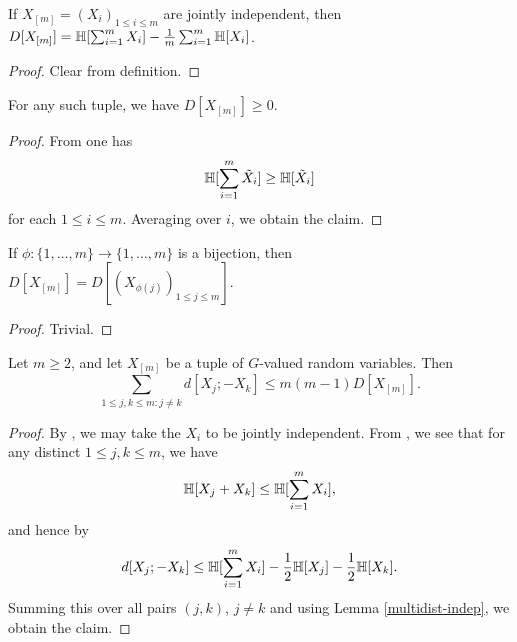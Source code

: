 \begin{lemma}\label{multidist-indep}\leanok  If $X_{[m]} = (X_i)_{1 \leq i \leq m}$ are jointly independent, then $D[X_{[m]}] = \mathbb{H}[\sum_{i=1}^m X_i] - \frac{1}{m} \sum_{i=1}^m \mathbb{H}[X_i]$.
\end{lemma}

\begin{proof}\leanok  Clear from definition.
\end{proof}

\begin{lemma}[Nonnegativity]\label{multidist-nonneg}\leanok  For any such tuple, we have $D[X_{[m]}] \geq 0$.
\end{lemma}

\begin{proof}\leanok  From  one has
$$ \mathbb{H}[\sum_{i =1}^m \tilde X_i] \geq \mathbb{H}[\tilde X_i]$$
for each $1 \leq i \leq m$.  Averaging over $i$, we obtain the claim.
\end{proof}

\begin{lemma}[Relabeling]\label{multidist-perm}\leanok If $\phi: \{1,\dots,m\} \to \{1,\dots,m\}$ is a bijection, then $D[X_{[m]}] = D[(X_{\phi(j)})_{1 \leq j \leq m}]$.
\end{lemma}

\begin{proof}\leanok Trivial.
\end{proof}

\begin{lemma}\label{multidist-ruzsa-I}\leanok
  Let $m \ge 2$, and let $X_{[m]}$ be a tuple of $G$-valued random variables. Then
  $$\sum_{1 \leq j,k \leq m: j \neq k} d[X_j; -X_k] \leq m(m-1) D[X_{[m]}].$$
\end{lemma}

\begin{proof}\leanok
By ,  we may take the $X_i$ to be jointly independent.  From , we see that for any distinct $1 \leq j,k \leq m$, we have
  \[
    \mathbb{H}[X_j+X_k] \leq \mathbb{H}[\sum_{i=1}^m X_i],
  \]
  and hence by 
  \[
    d[X_j;-X_k] \leq \mathbb{H}[\sum_{i=1}^m X_i] - \frac{1}{2} \mathbb{H}[X_j] - \frac{1}{2} \mathbb{H}[X_k].
  \]
  Summing this over all pairs $(j,k)$, $j \neq k$ and using Lemma \ref{multidist-indep}, we obtain the claim.
\end{proof}

